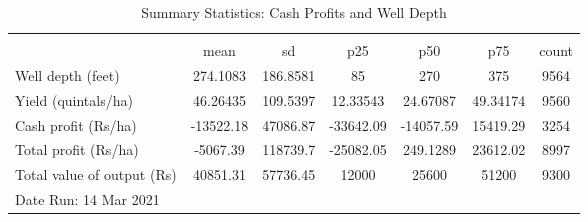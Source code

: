 \begin{table}[htbp]\centering
\def\sym#1{\ifmmode^{#1}\else\(^{#1}\)\fi}
\caption{Summary Statistics: Cash Profits and Well Depth}
\begin{tabular*}{1.0\hsize}{@{\hskip\tabcolsep\extracolsep\fill}l*{1}{cccccc}}
\toprule
                                    &\multicolumn{6}{c}{}                                                         \\
                                    &        mean&          sd&         p25&         p50&         p75&       count\\
\midrule
Well depth (feet)                   &    274.1083&    186.8581&          85&         270&         375&        9564\\
Yield (quintals/ha)                 &    46.26435&    109.5397&    12.33543&    24.67087&    49.34174&        9560\\
Cash profit (Rs/ha)                 &   -13522.18&    47086.87&   -33642.09&   -14057.59&    15419.29&        3254\\
Total profit (Rs/ha)                &    -5067.39&    118739.7&   -25082.05&    249.1289&    23612.02&        8997\\
Total value of output (Rs)          &    40851.31&    57736.45&       12000&       25600&       51200&        9300\\
\bottomrule
\multicolumn{7}{l}{\footnotesize Date Run: 14 Mar 2021}\\
\end{tabular*}
\end{table}
